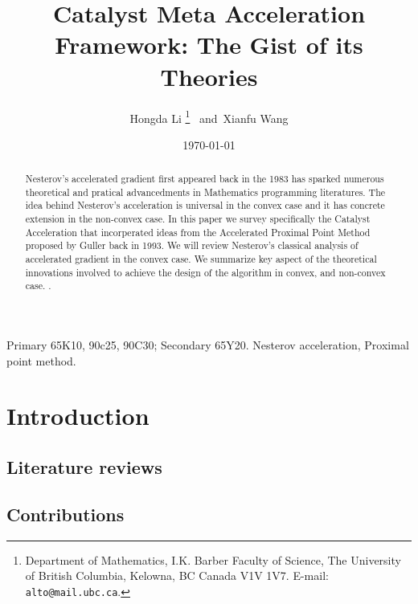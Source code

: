 \documentclass[12pt]{article}
\begin{document}
\title{
    {
        \selectfont 
        Catalyst Meta Acceleration Framework: The Gist of its Theories
    }
    }

\author{
    Hongda Li
    \thanks{Department of Mathematics, I.K. Barber Faculty of Science,
    The University of British Columbia, Kelowna, BC Canada V1V 1V7. E-mail:  \texttt{alto@mail.ubc.ca}.}~ and~Xianfu Wang
}

\date{\today}

\maketitle


\begin{abstract} 
    \noindent
    Nesterov's accelerated gradient first appeared back in the 1983 has sparked numerous theoretical and pratical advancedments in Mathematics programming literatures. 
    The idea behind Nesterov's acceleration is universal in the convex case and it has concrete extension in the non-convex case. 
    In this paper we survey specifically the Catalyst Acceleration that incorperated ideas from the Accelerated Proximal Point Method proposed by Guller back in 1993. 
    We will review Nesterov's classical analysis of accelerated gradient in the convex case. 
    We summarize key aspect of the theoretical innovations involved to achieve the design of the algorithm in convex, and non-convex case. 
    \cite{bezanson_julia_2017}. 
    
\end{abstract}

Primary 65K10, 90c25, 90C30; Secondary 65Y20. 
 Nesterov acceleration, Proximal point method. 

\section{Introduction}
    
    \subsection{Literature reviews}    
    \subsection{Contributions}
    
\end{document}
